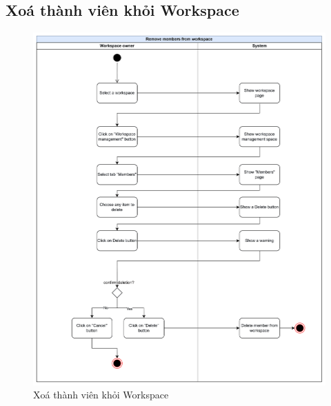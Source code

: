 \subsection{Xoá thành viên khỏi Workspace}
    \begin{figure}[H]
        \centering
        \includegraphics[width=\linewidth]{Content/Phân tích và thiết kế hệ thống/documents/Sơ đồ hoạt động/images/removeMemberFromWorkspace.png}
        \vspace{0.5cm}
        \caption{Xoá thành viên khỏi Workspace}
        \label{fig:Xoá thành viên khỏi Workspace}
    \end{figure}